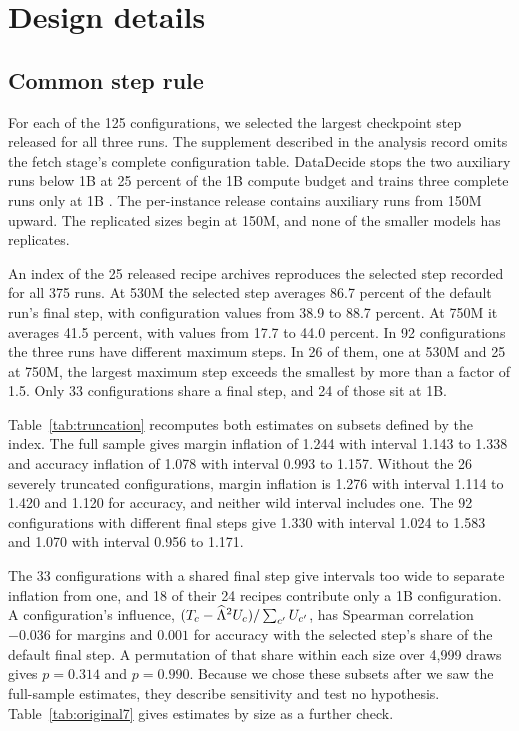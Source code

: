 \section{Design details}
\label{app:design}

\subsection{Common step rule}
\label{app:schedule}
For each of the 125 configurations, we selected the largest checkpoint step released for all three runs. The supplement described in the analysis record omits the fetch stage's complete configuration table. DataDecide stops the two auxiliary runs below 1B at 25 percent of the 1B compute budget and trains three complete runs only at 1B \citep{magnusson2025}. The per-instance release contains auxiliary runs from 150M upward. The replicated sizes begin at 150M, and none of the smaller models has replicates.

An index of the 25 released recipe archives reproduces the selected step recorded for all 375 runs. At 530M the selected step averages 86.7 percent of the default run's final step, with configuration values from 38.9 to 88.7 percent. At 750M it averages 41.5 percent, with values from 17.7 to 44.0 percent. In 92 configurations the three runs have different maximum steps. In 26 of them, one at 530M and 25 at 750M, the largest maximum step exceeds the smallest by more than a factor of 1.5. Only 33 configurations share a final step, and 24 of those sit at 1B.

Table~\ref{tab:truncation} recomputes both estimates on subsets defined by the index. The full sample gives margin inflation of 1.244 with interval 1.143 to 1.338 and accuracy inflation of 1.078 with interval 0.993 to 1.157. Without the 26 severely truncated configurations, margin inflation is 1.276 with interval 1.114 to 1.420 and 1.120 for accuracy, and neither wild interval includes one. The 92 configurations with different final steps give 1.330 with interval 1.024 to 1.583 and 1.070 with interval 0.956 to 1.171.

The 33 configurations with a shared final step give intervals too wide to separate inflation from one, and 18 of their 24 recipes contribute only a 1B configuration. A configuration's influence, $(T_c-\widehat{\Lambda}^2U_c)/\sum_{c'}U_{c'}$, has Spearman correlation $-0.036$ for margins and $0.001$ for accuracy with the selected step's share of the default final step. A permutation of that share within each size over 4,999 draws gives $p=0.314$ and $p=0.990$. Because we chose these subsets after we saw the full-sample estimates, they describe sensitivity and test no hypothesis. Table~\ref{tab:original7} gives estimates by size as a further check.

